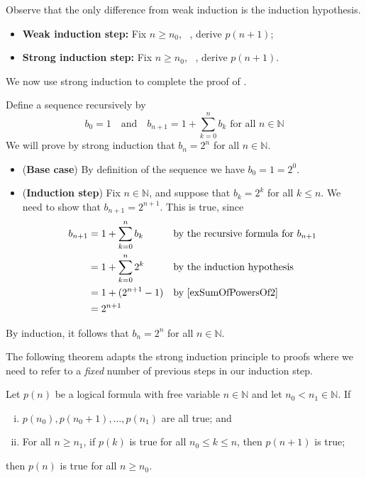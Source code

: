 Observe that the only difference from weak induction is the induction hypothesis.
\begin{itemize}
\item \textbf{Weak induction step:} Fix $n \ge n_0$, ~, derive $p(n+1)$;
\item \textbf{Strong induction step:} Fix $n \ge n_0$, ~, derive $p(n+1)$.
\end{itemize}

We now use strong induction to complete the proof of .

\begin{example}
Define a sequence recursively by
\[ b_0 = 1 \quad \text{and} \quad b_{n+1} = 1 + \sum_{k=0}^n b_k \text{ for all } n \in \mathbb{N} \]
We will prove by strong induction that $b_n = 2^n$ for all $n \in \mathbb{N}$.

\begin{itemize}
\item (\textbf{Base case}) By definition of the sequence we have $b_0=1=2^0$.
\item (\textbf{Induction step}) Fix $n \in \mathbb{N}$, and suppose that $b_k=2^k$ for all $k \le n$. We need to show that $b_{n+1}=2^{n+1}$. This is true, since
\begin{align*}
b_{n+1} &= 1 + \sum_{k=0}^n b_k && \text{by the recursive formula for $b_{n+1}$} \\
&= 1 + \sum_{k=0}^n 2^k && \text{by the induction hypothesis} \\
&= 1 + (2^{n+1}-1) && \text{by \Cref{exSumOfPowersOf2}} \\
&= 2^{n+1}
\end{align*}
\end{itemize}
By induction, it follows that $b_n=2^n$ for all $n \in \mathbb{N}$.
\end{example}

The following theorem adapts the strong induction principle to proofs where we need to refer to a \textit{fixed} number of previous steps in our induction step.

\begin{theorem}
\label{thmSIPMultipleBaseCases}
Let $p(n)$ be a logical formula with free variable $n \in \mathbb{N}$ and let $n_0 < n_1 \in \mathbb{N}$. If
\begin{enumerate}[(i)] \vspace{5pt} 
\item $p(n_0), p(n_0+1), \dots, p(n_1)$ are all true; and
\item For all $n \ge n_1$, if $p(k)$ is true for all $n_0 \le k \le n$, then $p(n+1)$ is true;
\end{enumerate}
\vspace{5pt}
then $p(n)$ is true for all $n \ge n_0$.
\end{theorem}

